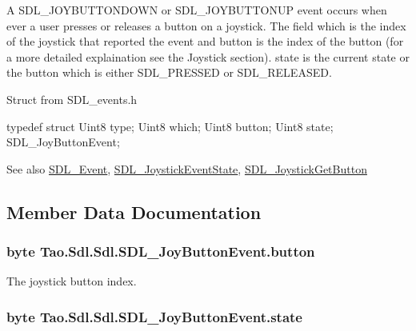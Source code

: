 A SDL\_\-JOYBUTTONDOWN or SDL\_\-JOYBUTTONUP event occurs when ever a user presses or releases a button on a joystick. The field which is the index of the joystick that reported the event and button is the index of the button (for a more detailed explaination see the Joystick section). state is the current state or the button which is either SDL\_\-PRESSED or SDL\_\-RELEASED. 

Struct from SDL\_\-events.h 
\begin{DoxyCode}
            typedef struct{
                        Uint8 type;
                        Uint8 which;
                        Uint8 button;
                        Uint8 state;
                } SDL_JoyButtonEvent;
\end{DoxyCode}
 \begin{DoxySeeAlso}{See also}
\hyperlink{struct_tao_1_1_sdl_1_1_s_d_l___event}{SDL\_\-Event}, \hyperlink{_sdl_8cs_a4b5786d792bade406949c738f0290eca}{SDL\_\-JoystickEventState}, \hyperlink{_sdl_8cs_ab46ed3af900d20b62a7aa26570ecdff8}{SDL\_\-JoystickGetButton}


\end{DoxySeeAlso}


\subsection{Member Data Documentation}
\hypertarget{struct_tao_1_1_sdl_1_1_sdl_1_1_s_d_l___joy_button_event_a94d2880b48947c6bac2b1559c410160d}{
\subsubsection[{button}]{\setlength{\rightskip}{0pt plus 5cm}byte {\bf Tao.Sdl.Sdl.SDL\_\-JoyButtonEvent.button}}}
\label{struct_tao_1_1_sdl_1_1_sdl_1_1_s_d_l___joy_button_event_a94d2880b48947c6bac2b1559c410160d}


The joystick button index. 

\hypertarget{struct_tao_1_1_sdl_1_1_sdl_1_1_s_d_l___joy_button_event_a619b7e193745b69d03fa61e6968376a9}{
\subsubsection[{state}]{\setlength{\rightskip}{0pt plus 5cm}byte {\bf Tao.Sdl.Sdl.SDL\_\-JoyButtonEvent.state}}}
\label{struct_tao_1_1_sdl_1_1_sdl_1_1_s_d_l___joy_button_event_a619b7e193745b69d03fa61e6968376a9}


